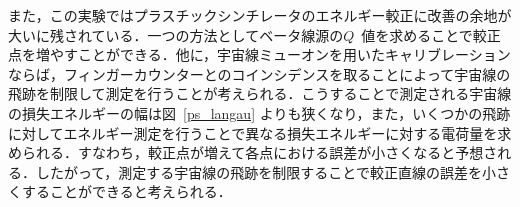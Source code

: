 また，この実験ではプラスチックシンチレータのエネルギー較正に改善の余地が大いに残されている．一つの方法としてベータ線源の$Q$~値を求めることで較正点を増やすことができる．他に，宇宙線ミューオンを用いたキャリブレーションならば，フィンガーカウンターとのコインシデンスを取ることによって宇宙線の飛跡を制限して測定を行うことが考えられる．こうすることで測定される宇宙線の損失エネルギーの幅は図~\ref{ps_langau} よりも狭くなり，また，いくつかの飛跡に対してエネルギー測定を行うことで異なる損失エネルギーに対する電荷量を求められる．すなわち，較正点が増えて各点における誤差が小さくなると予想される．したがって，測定する宇宙線の飛跡を制限することで較正直線の誤差を小さくすることができると考えられる．





